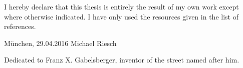 \cleardoublepage

\thispagestyle{empty}
	\vspace*{0.8\textheight}
	\noindent
	I hereby declare that this thesis is entirely the result of my own work except where otherwise indicated. I have only used the resources given in the list of references.

	\vspace{15mm}
	\noindent
	München, 29.04.2016 \hspace{5cm} Michael Riesch
\newpage

\thispagestyle{empty}
\phantom{u}
\phantom{1}\vspace{6cm}
\begin{center}
Dedicated to Franz X. Gabelsberger, inventor of the street named after him.
\end{center}
